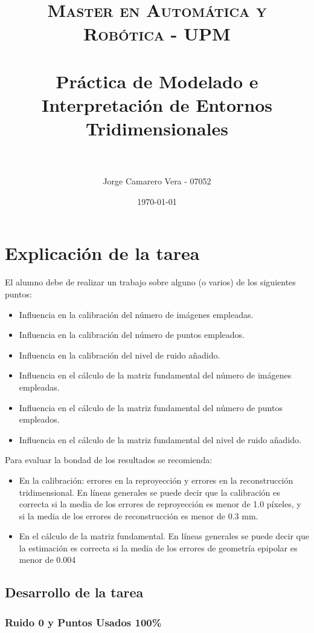 \documentclass[a4paper, fontsize=11pt]{scrartcl} %
\title{	
	\normalfont \normalsize 
	\textsc{Master en Automática y Robótica - UPM} \\ [25pt] %
	\horrule{0.5pt} \\[0.4cm] %
	\huge Práctica de Modelado e Interpretación de Entornos Tridimensionales \\ %
	\horrule{2pt} \\[0.5cm] %
}
\author{Jorge Camarero Vera - 07052} %
\date{\normalsize\today} %
\numberwithin{equation}{section} %
\numberwithin{figure}{section} %
\numberwithin{table}{section} %
\begin{document}
	\maketitle
	
	\section{Explicación de la tarea}
	
	El alumno debe de realizar un trabajo sobre alguno (o varios) de los siguientes puntos:
	\begin{itemize}
		\item Influencia en la calibración del número de imágenes empleadas.
		\item Influencia en la calibración del número de puntos empleados.
		\item Influencia en la calibración del nivel de ruido añadido.
		\item Influencia en el cálculo de la matriz fundamental del número de imágenes empleadas.
		\item Influencia en el cálculo de la matriz fundamental del número de puntos empleados.
		\item Influencia en el cálculo de la matriz fundamental del nivel de ruido añadido.
	\end{itemize}
	
	Para evaluar la bondad de los resultados se recomienda:
	\begin{itemize}
		\item En la calibración: errores en la reproyección y errores en la reconstrucción tridimensional.
		En líneas generales se puede decir que la calibración es correcta si la media de los errores de
		reproyección es menor de 1.0 píxeles, y si la media de los errores de reconstrucción es
		menor de 0.3 mm. 
		
		\item En el cálculo de la matriz fundamental. En líneas generales se puede decir que la estimación
		es correcta si la media de los errores de geometría epipolar es menor de 0.004 
	\end{itemize}
	
	\subsection{Desarrollo de la tarea}
	
	\subsubsection{Ruido 0 y Puntos Usados 100\%}
	
\end{document}
